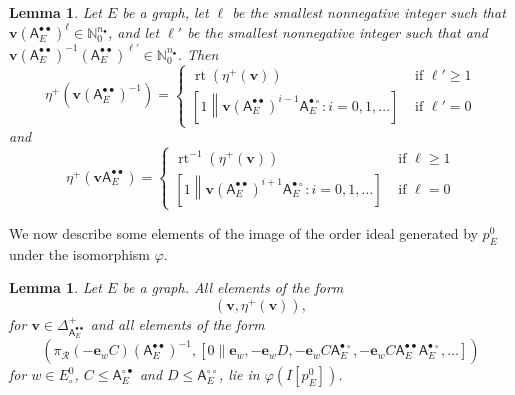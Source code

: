 \documentclass[12pt]{amsbook}%
\newcommand{\rt}{\operatorname{rt}}
\newcommand{\ee}{{\mathbf e}}
\renewcommand{\phi}{\varphi}
\newtheorem{lemma}[theor]{Lemma}
\theoremstyle{defin}
\theoremstyle{remark}
\numberwithin{equation}{chapter}
\numberwithin{theor}{section}
\newcommand{\NN}{\mathbb{N}}
\newcommand{\oXe}[2]{\left[#1\left\|{#2}\right.\right]}
\newcommand{\regX}{{\bullet}}
\newcommand{\singX}{{\circ}}
\newcommand{\vv}{\mathbf{v}}
\newcommand{\nor}{{n_\regX}}
\newcommand{\pK}[1]{\pi_{\mathcal R}(#1)}
\newcommand{\adjRR}{\mathsf{A}^{\bullet\bullet}}
\newcommand{\adjRS}{\mathsf{A}^{\bullet\circ}}
\newcommand{\adjSR}{\mathsf{A}^{\circ\bullet }}
\newcommand{\adjSS}{\mathsf{A}^{\circ\circ}}
\begin{document}
\begin{lemma}\label{lem-dimgrp-inv-plus}
Let $E$ be a graph, let $\ell$ be the smallest nonnegative integer such that $\vv (\adjRR_E)^\ell \in \NN_0^\nor$, and let $\ell'$ be the smallest nonnegative integer such that and $\vv(\adjRR_E)^{-1} (\adjRR_E)^{\ell'} \in \NN_0^\nor$.  Then
\[
\eta^+( \vv (\adjRR_E)^{-1}) = \begin{cases} \rt(\eta^+(\vv)) &\text{ if } \ell' \geq 1 \\ \oXe{1}{\vv(\adjRR_E)^{i-1} \adjRS_E : i=0,1,\dots } &\text{ if } \ell' = 0 \end{cases}
\]
and 
\[
\eta^+( \vv \adjRR_E) = \begin{cases} \rt^{-1} (\eta^+(\vv)) &\text{ if } \ell \geq 1 \\ \oXe{1}{\vv(\adjRR_E)^{i+1} \adjRS_E : i=0,1,\dots } &\text{ if } \ell = 0 \end{cases}
\]
\end{lemma}

We now describe some elements of the image of the order ideal generated by $p_E^0$ under the isomorphism $\phi$.


\begin{lemma}\label{lem-scale}
Let $E$ be a graph.  All elements of the form
\[
\left(\vv,\eta^+(\vv)\right), 
\]
for $\vv\in \Delta_{\adjRR_E}^+$ and all elements of the form
\begin{equation}\label{singgen}
\left(\pK{-\ee_w C} (\adjRR_E)^{-1},\oXe{0}{\ee_w,-\ee_wD, - \mathbf{e}_w C\adjRS_E,  - \mathbf{e}_w C \adjRR_E \adjRS_E,\dots} \right)
\end{equation}
for $w\in E^0_\singX$,  $C\leq \adjSR_E$ and  $D\leq \adjSS_E$, lie in $\phi(I[p_E^0])$.
\end{lemma}
\end{document}
